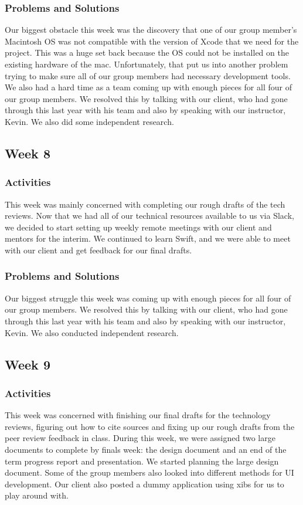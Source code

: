 \documentclass[onecolumn, draftclsnofoot,10pt, compsoc]{IEEEtran}
\begin{document}
\subsubsection{Problems and Solutions}
Our biggest obstacle this week was the discovery that one of our group member’s Macintosh OS was not compatible with the version of Xcode that we need for the project. This was a huge set back because the OS could not be installed on the existing hardware of the mac. Unfortunately, that put us into another problem trying to make sure all of our group members had necessary development tools. We also had a hard time as a team coming up with enough pieces for all four of our group members. We resolved this by talking with our client, who had gone through this last year with his team and also by speaking with our instructor, Kevin. We also did some independent research.

\subsection{Week 8}
\subsubsection{Activities}
This week was mainly concerned with completing our rough drafts of the tech reviews. Now that we had all of our technical resources available to us via Slack, we decided to start setting up weekly remote meetings with our client and mentors for the interim. We continued to learn Swift, and we were able to meet with our client and get feedback for our final drafts.

\subsubsection{Problems and Solutions}
Our biggest struggle this week was coming up with enough pieces for all four of our group members. We resolved this by talking with our client, who had gone through this last year with his team and also by speaking with our instructor, Kevin. We also conducted independent research.

\subsection{Week 9}
\subsubsection{Activities}
This week was concerned with finishing our final drafts for the technology reviews, figuring out how to cite sources and fixing up our rough drafts from the peer review feedback in class. During this week, we  were assigned two large documents to complete by finals week: the design document and an end of the term progress report and presentation. We started planning the large design document. Some of the group members also looked into different methods for UI development. Our client also posted a dummy application using xibs for us to play around with. 
\end{document}
